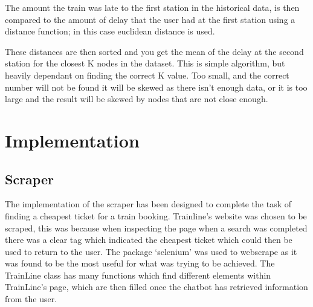 \documentclass[11pt]{article}
\begin{document}
	The amount the train was late to the first station in the historical data, is then compared to the amount of delay that the user had at the first station using a distance function; in this case euclidean distance is used.
	
	These distances are then sorted and you get the mean of the delay at the second station for the closest K nodes in the dataset. This is simple algorithm, but heavily dependant on finding the correct K value. Too small, and the correct number will not be found  it will be skewed as there isn't enough data, or it is too large and the result will be skewed by nodes that are not close enough.
	
	
	
	\section{Implementation} \label{Implementation}
	
	\subsection{Scraper}
	The implementation of the scraper has been designed to complete the task of finding a cheapest ticket for a train booking. Trainline’s website \citet{trainline} was chosen to be scraped, this was because when inspecting the page when a search was completed there was a clear tag which indicated the cheapest ticket which could then be used to return to the user. The package `selenium’ \citet{selenium} was used to webscrape as it was found to be the most useful for what was trying to be achieved. The TrainLine class has many functions which find different elements within TrainLine’s page, which are then filled once the chatbot has retrieved information from the user. 
	
\end{document}
